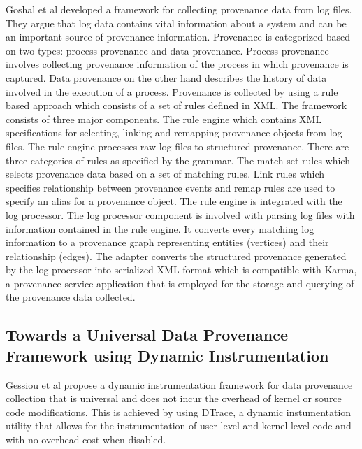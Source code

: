 Goshal et al \cite{ghoshal_provenance_2013} developed a framework for collecting provenance data from log files. They argue that log data contains vital information about a system and can be an important source of provenance information. Provenance is categorized based on two types: process provenance and data provenance. Process provenance involves collecting provenance information of the process in which provenance is captured. Data provenance on the other hand describes the history of data involved in the execution of a process. Provenance is collected by using a rule based approach which consists of a set of rules defined in XML. The framework consists of three major components. The rule engine which contains XML specifications for selecting, linking and remapping provenance objects from log files. The rule engine processes raw log files to structured provenance. There are three categories of rules as specified by the grammar. The match-set rules which selects provenance data based on a set of matching rules. Link rules which specifies relationship between provenance events and remap rules are used to specify an alias for a provenance object. The rule engine is integrated with the log processor. The log processor component is involved with parsing log files with information contained in the rule engine. It converts every matching log information to a provenance graph representing entities (vertices) and their relationship (edges). The adapter converts the structured provenance generated by the log processor into serialized XML format which is compatible with Karma, a provenance service application that is employed for the storage and querying of the provenance data collected.




\subsection{Towards a Universal Data Provenance Framework using Dynamic Instrumentation}
Gessiou et al \cite{gessiou_towards_2012} propose a dynamic instrumentation framework for data provenance collection that is universal and does not incur the overhead of kernel or source code modifications. This is achieved by using DTrace, a dynamic instumentation utility that allows for the instrumentation of user-level and kernel-level code and with no overhead cost when disabled. 

